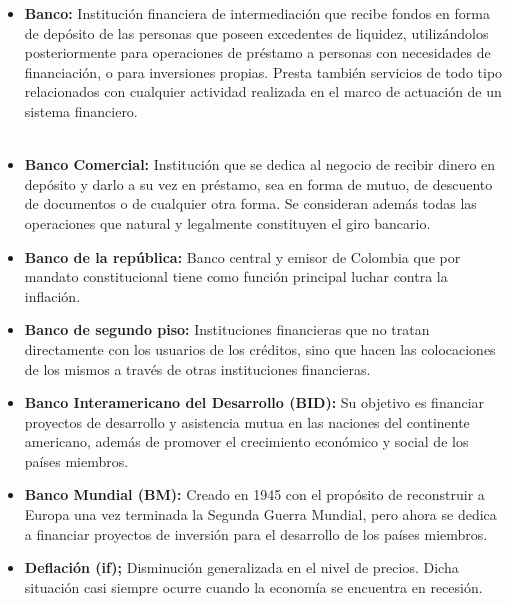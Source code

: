 \begin{itemize}

	\item \textbf{Banco: }
	      Institución financiera de intermediación que recibe fondos en forma de depósito de las personas que poseen excedentes de liquidez, utilizándolos posteriormente para operaciones de préstamo a personas con necesidades de financiación, o para inversiones propias. Presta también servicios de todo tipo relacionados con cualquier actividad realizada en el marco de actuación de un sistema financiero.\\ \\
	      
	\item \textbf{Banco Comercial: }
	      Institución que se dedica al negocio de recibir dinero en depósito y darlo a su vez en préstamo, sea en forma de mutuo, de descuento de documentos o de cualquier otra forma. Se consideran además todas las operaciones que natural y legalmente constituyen el giro bancario.\\
	      
	\item \textbf{Banco de la república: }
	      Banco central y emisor de Colombia que por mandato constitucional tiene como función principal luchar contra la inflación.\\
	      
	\item \textbf{Banco de segundo piso:} Instituciones financieras que no tratan directamente con los usuarios de los créditos, sino que hacen las colocaciones de los mismos a través de otras instituciones financieras.\\
	      
	\item \textbf{Banco Interamericano del Desarrollo (BID): }
	      Su objetivo es financiar proyectos de desarrollo y asistencia mutua en las naciones del continente americano, además de promover el crecimiento económico y social de los países miembros.\\
	      
	\item \textbf{Banco Mundial (BM): }
	      Creado en 1945 con el propósito de reconstruir a Europa una vez terminada la Segunda Guerra Mundial, pero ahora se dedica a financiar proyectos de inversión para el desarrollo de los países miembros.\\
	      
	\item {\textbf{Deflación (if); }}
	      Disminución generalizada en el nivel de precios. Dicha situación casi siempre ocurre cuando la economía se encuentra en recesión.\\
	      

\end{itemize}

